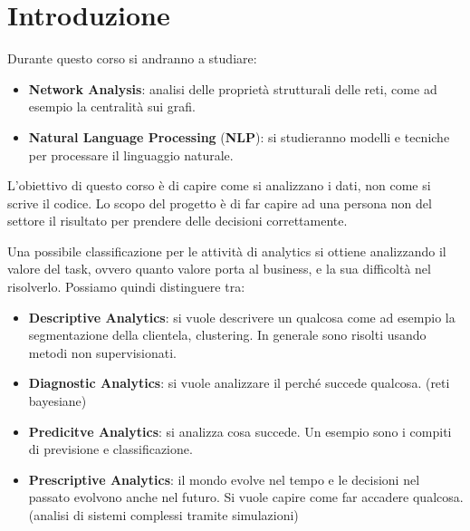 \chapter{Introduzione}
Durante questo corso si andranno a studiare:
\begin{itemize}
    \item \textbf{Network Analysis}: analisi delle proprietà strutturali delle
          reti, come ad esempio la centralità sui grafi.
    \item \textbf{Natural Language Processing} (\textbf{NLP}): si studieranno
          modelli e tecniche per processare il linguaggio naturale.
\end{itemize}
\begin{nota}
    L'obiettivo di questo corso è di capire come si analizzano i dati, non come
    si scrive il codice. Lo scopo del progetto è di far capire ad una persona non
    del settore il risultato per prendere delle decisioni correttamente.
\end{nota}

Una possibile classificazione per le attività di analytics si ottiene analizzando
il valore del task, ovvero quanto valore porta al business, e la sua difficoltà
nel risolverlo. Possiamo quindi distinguere tra:
\begin{itemize}
    \item \textbf{Descriptive Analytics}: si vuole descrivere un qualcosa come
          ad esempio la segmentazione della clientela, clustering. In generale
          sono risolti usando metodi non supervisionati.
    \item \textbf{Diagnostic Analytics}: si vuole analizzare il perché succede
          qualcosa. (reti bayesiane)
    \item \textbf{Predicitve Analytics}: si analizza cosa succede. Un esempio
          sono i compiti di previsione e classificazione.
    \item \textbf{Prescriptive Analytics}: il mondo evolve nel tempo e le
          decisioni nel passato evolvono anche nel futuro. Si vuole capire come
          far accadere qualcosa. (analisi di sistemi complessi tramite simulazioni)
\end{itemize}

